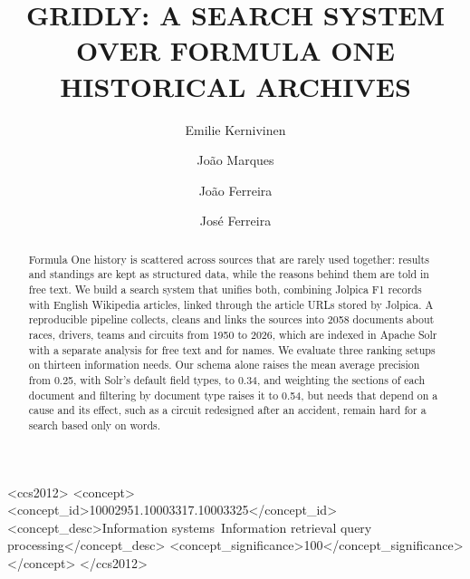 \documentclass[sigconf]{acmart}
\begin{document}
\title{GRIDLY: A SEARCH SYSTEM OVER FORMULA ONE HISTORICAL ARCHIVES}

\author{Emilie Kernivinen}

\author{João Marques}

\author{João Ferreira}

\author{José Ferreira}

\renewcommand{\shortauthors}{Emilie Kernivinen, João Marques, João Ferreira and José Ferreira}

\renewcommand{\abstractname}{ABSTRACT}
\begin{abstract}
  Formula One history is scattered across sources that are rarely used
  together: results and standings are kept as structured data, while the
  reasons behind them are told in free text. We build a search system that
  unifies both, combining Jolpica F1 records with English Wikipedia articles,
  linked through the article URLs stored by Jolpica. A reproducible pipeline
  collects, cleans and links the sources into 2058 documents about races,
  drivers, teams and circuits from 1950 to 2026, which are indexed in Apache
  Solr with a separate analysis for free text and for names. We evaluate three
  ranking setups on thirteen information needs. Our schema alone raises the
  mean average precision from 0.25, with Solr's default field types, to 0.34,
  and weighting the sections of each document and filtering by document type
  raises it to 0.54, but needs that
  depend on a cause and its effect, such as a circuit redesigned after an
  accident, remain hard for a search based only on words.
\end{abstract}


\begin{CCSXML}
<ccs2012>
<concept>
<concept_id>10002951.10003317.10003325</concept_id>
<concept_desc>Information systems~Information retrieval query processing</concept_desc>
<concept_significance>100</concept_significance>
</concept>
</ccs2012>
\end{CCSXML}
\end{document}
